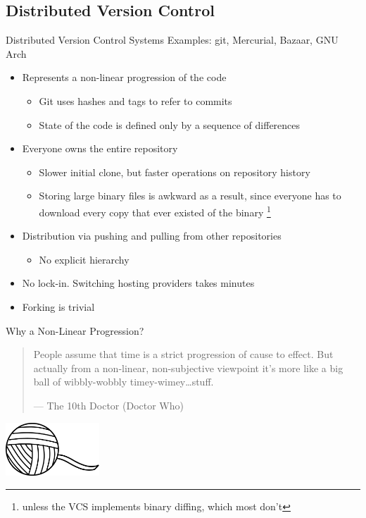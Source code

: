 \documentclass[aspectratio=43]{beamer}
\begin{document}
\subsection{Distributed Version Control}

\begin{frame}{Distributed Version Control Systems}
    Examples: git, Mercurial, Bazaar, GNU Arch
    \begin{itemize}
    \item Represents a non-linear progression of the code
    \begin{itemize}
        \item Git uses hashes and tags to refer to commits
        \item State of the code is defined only by a sequence of differences
    \end{itemize}
    \item Everyone owns the entire repository
    \begin{itemize}
        \item Slower initial clone, but faster operations on repository history
        \item Storing large binary files is awkward as a result, since everyone
            has to download every copy that ever existed of the binary
            \footnote{unless the VCS implements binary diffing, which most
                      don't}
    \end{itemize}
    \item Distribution via pushing and pulling from other repositories
        \begin{itemize}
        \item No explicit hierarchy
        \end{itemize}
    \item No lock-in. Switching hosting providers takes minutes
    \item Forking is trivial
    \end{itemize}
\end{frame}

\begin{frame}{Why a Non-Linear Progression?}
    \begin{quotation}
        People assume that time is a strict progression of cause to effect. But
        actually from a non-linear, non-subjective viewpoint it's more like a
        big ball of wibbly-wobbly timey-wimey\ldots stuff.

        --- The 10th Doctor (Doctor Who)
    \end{quotation}
    \begin{flushright}
        \includegraphics[height=2cm]{resources/ball_of_yarn.pdf}
    \end{flushright}
\end{frame}
\end{document}
